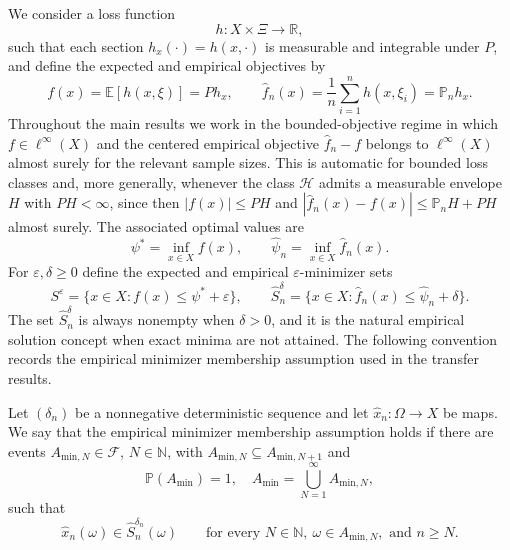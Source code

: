 \documentclass[11pt]{article}
\begin{document}
We consider a loss function 
\begin{equation}
h:X\times\Xi\to\mathbb{R},\label{eq:loss}
\end{equation}
such that each section $h_{x}(\cdot)=h(x,\cdot)$ is measurable and
integrable under $P$, and define the expected and empirical objectives
by 
\begin{equation}
f(x)=\mathbb{E}[h(x,\xi)]=Ph_{x},\qquad\hat{f}_{n}(x)=\frac{1}{n}\sum_{i=1}^{n}h(x,\xi_{i})=\mathbb{P}_{n}h_{x}.\label{eq:obj-defs}
\end{equation}
Throughout the main results we work in the bounded-objective regime
in which $f\in\ell^{\infty}(X)$ and the centered empirical objective
$\hat{f}_{n}-f$ belongs to $\ell^{\infty}(X)$ almost surely for
the relevant sample sizes. This is automatic for bounded loss classes
and, more generally, whenever the class $\mathcal{H}$ admits a measurable
envelope $H$ with $PH<\infty$, since then $|f(x)|\le PH$ and $|\hat{f}_{n}(x)-f(x)|\le\mathbb{P}_{n}H+PH$
almost surely. The associated optimal values are 
\begin{equation}
\psi^{*}=\inf_{x\in X}f(x),\qquad\hat{\psi}_{n}=\inf_{x\in X}\hat{f}_{n}(x).\label{eq:value-defs}
\end{equation}
For $\varepsilon,\delta\ge0$ define the expected and empirical $\varepsilon$-minimizer
sets 
\begin{equation}
S^{\varepsilon}=\{x\in X:f(x)\le\psi^{*}+\varepsilon\},\qquad\hat{S}_{n}^{\delta}=\{x\in X:\hat{f}_{n}(x)\le\hat{\psi}_{n}+\delta\}.\label{eq:near-minimizers}
\end{equation}
The set $\hat{S}_{n}^{\delta}$ is always nonempty when $\delta>0$,
and it is the natural empirical solution concept when exact minima
are not attained. The following convention records the empirical
minimizer membership assumption used in the transfer results.


\begin{assumption}\label{ass:emp-min-membership}
Let $(\delta_{n})$ be a nonnegative deterministic sequence and let
$\hat{x}_{n}:\Omega\to X$ be maps. We say that the empirical minimizer
membership assumption holds if there are events $A_{\mathrm{min},N}\in\mathcal{F}$,
$N\in\mathbb{N}$, with $A_{\mathrm{min},N}\subseteq A_{\mathrm{min},N+1}$ and
\[
\mathbb{P}\left(A_\mathrm{min}\right)=1,\quad A_\mathrm{min}=\bigcup_{N=1}^{\infty}A_{\mathrm{min},N},
\]
such that
\[
\hat{x}_{n}(\omega)\in\hat{S}_{n}^{\delta_{n}}(\omega)\qquad\text{for every }N\in\mathbb{N},\ \omega\in A_{\mathrm{min},N},\text{ and }n\ge N.
\]
\end{assumption}
\end{document}
